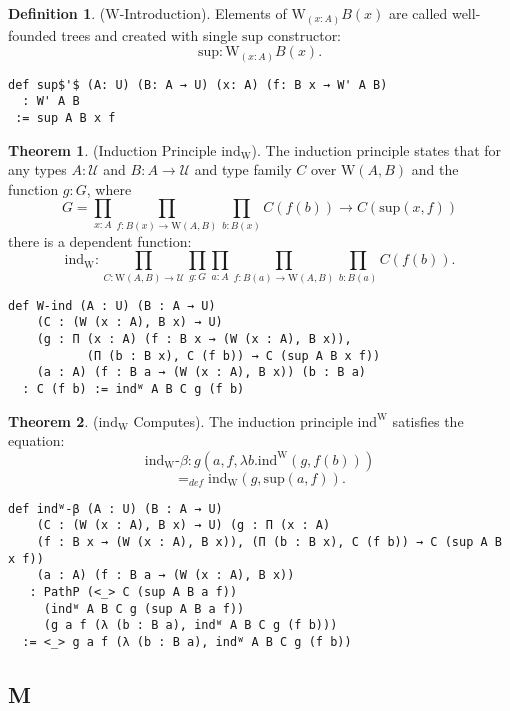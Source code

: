 \documentclass{article}
\theoremstyle{definition}
\newtheorem{theorem}{Theorem}
\newtheorem{definition}{Definition}
\begin{document}
\begin{definition} ($\mathrm{W}$-Introduction).
Elements of $\mathrm{W}_{(x : A)} B(x)$ are called
well-founded trees and created with single $\mathrm{sup}$ constructor:
$$
  \mathrm{sup} : \mathrm{W}_{(x: A)} B(x).
$$
\begin{lstlisting}
def sup$'$ (A: U) (B: A → U) (x: A) (f: B x → W' A B)
  : W' A B
 := sup A B x f
\end{lstlisting}
\end{definition}

\begin{theorem} (Induction Principle $\mathrm{ind_W}$).
The induction principle states that for any types $A: \mathcal{U}$
and $B: A \rightarrow \mathcal{U}$ and type family $C$ over $\mathrm{W}(A,B)$
and the function $g : G$, where
$$
  G = \prod_{x: A}\prod_{f: B(x) → \mathrm{W}(A,B)}\prod_{b: B(x)} C(f(b)) → C(\mathrm{sup}(x,f))
$$
there is a dependent function:
$$
   \mathrm{ind_W} : \prod_{C: \mathrm{W}(A,B) → \mathcal{U}}\prod_{g:G}\prod_{a: A}\prod_{f: B(a) → \mathrm{W}(A,B)}\prod_{b: B(a)}C(f(b)).
$$
\begin{lstlisting}
def W-ind (A : U) (B : A → U)
    (C : (W (x : A), B x) → U)
    (g : Π (x : A) (f : B x → (W (x : A), B x)),
           (Π (b : B x), C (f b)) → C (sup A B x f))
    (a : A) (f : B a → (W (x : A), B x)) (b : B a)
  : C (f b) := indᵂ A B C g (f b)
\end{lstlisting}
\end{theorem}

\begin{theorem}($\mathrm{ind_W}$ Computes).
The induction principle $\mathrm{ind^W}$ satisfies the equation:
$$
\mathrm{ind_W}\mbox{-}\beta : g(a,f,\lambda b.\mathrm{ind^W}(g,f(b))) 
$$
$$
  =_{def} \mathrm{ind_W}(g,\mathrm{sup}(a,f)).
$$
\begin{lstlisting}
def indᵂ-β (A : U) (B : A → U)
    (C : (W (x : A), B x) → U) (g : Π (x : A)
    (f : B x → (W (x : A), B x)), (Π (b : B x), C (f b)) → C (sup A B x f))
    (a : A) (f : B a → (W (x : A), B x))
   : PathP (<_> C (sup A B a f))
     (indᵂ A B C g (sup A B a f))
     (g a f (λ (b : B a), indᵂ A B C g (f b)))
  := <_> g a f (λ (b : B a), indᵂ A B C g (f b))
\end{lstlisting}
\end{theorem}

\subsection{M}
\end{document}
